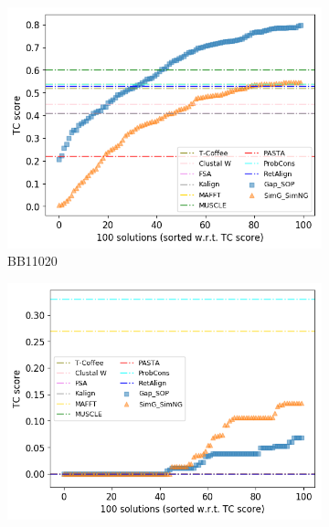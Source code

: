 \begin{figure}[!htbp]
\begin{adjustwidth}{-1cm}{-1cm}
		\begin{subfigure}{0.22\textwidth}
			\includegraphics[width=\columnwidth]{Figure/summary/precomputedInit/Balibase/BB11020_tc_density_single_run_2}
			\caption{BB11020}
		\end{subfigure}
		\begin{subfigure}{0.22\textwidth}
			\includegraphics[width=\columnwidth]{Figure/summary/precomputedInit/Balibase/BB11033_tc_density_single_run_2}

\end{subfigure}
\end{adjustwidth}
\end{figure}
